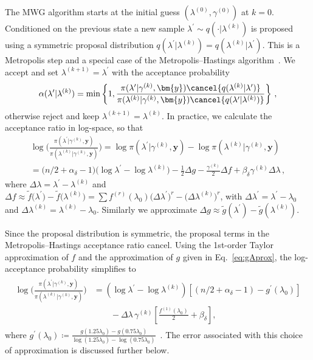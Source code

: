 The MWG algorithm starts at the initial guess $( \lambda^{(0)} , \gamma^{(0)}  )$ at $k=0$.
Conditioned on the previous state a new sample $\lambda^{\prime} \sim q(\cdot |  \lambda^{(k)})$ is proposed using a symmetric proposal distribution $q(\lambda^{\prime} |  \lambda^{(k)}) = q(\lambda^{(k)} |  \lambda^{\prime})$.
This is a Metropolis step and a special case of the Metropolis--Hastings algorithm~\cite{roberts2006harris}.
We accept and set $\lambda^{(k+1)} = \lambda^{\prime}$ with the acceptance probability
\begin{align}
\alpha( \lambda^{\prime} | \lambda^{(k)}) = \min \left\{ 1, \frac{\pi(\lambda^{\prime}  | \gamma^{(k)}, \bm{y}) \cancel{q(\lambda^{(k)} | \lambda^{\prime} ) } }{\pi(\lambda^{(k)} | \gamma^{(k)}, \bm{y}) \cancel{q(\lambda^{\prime} | \lambda^{(k)})} } \right\} \, ,
\end{align}
otherwise reject and keep $\lambda^{(k+1)} = \lambda^{(k)}$.
In practice, we calculate the acceptance ratio in log-space, so that
\begin{align} 
	\log\Bigg(  \frac{\pi(\lambda^{\prime} | \gamma^{(k)}, \bm{y})  }{\pi(\lambda^{(k)}| \gamma^{(k)}, \bm{y})}  \Bigg)
	= \log  \pi(\lambda^{\prime} | \gamma^{(k)}, \bm{y} )   -\log   \pi(\lambda^{(k)}| \gamma^{(k)}, \bm{y}) \\
	= \big( n/2+\alpha_{\delta}-1 \big) \Big(\log\lambda^{\prime} - \log\lambda^{(k)} \Big) - \frac{1}{2} \Delta g - \frac{\gamma^{(k)}}{2} \Delta f  + \beta_\delta \gamma^{(k)} \Delta \lambda  \, ,
\end{align}
where $\Delta \lambda = \lambda^{\prime} - \lambda^{(k)} $ and  $\Delta f \approx  \tilde{f} \big(\lambda^\prime\big) - \tilde{f}\big(\lambda^{(k)}\big) =   \sum f^{(r)}(\lambda_0) \big(\Delta \lambda^\prime \big)^r- \big(\Delta \lambda^{(k)} \big)^r $, with  $\Delta \lambda^{\prime} = \lambda^\prime - \lambda_0 $ and $\Delta \lambda^{(k)} =  \lambda^{(k)} - \lambda_0$.
Similarly we approximate $\Delta g \approx \tilde{g}(\lambda^{\prime}) -\tilde{g}(\lambda^{(k)})$.
\begin{mccorrection}
\noindent Since the proposal distribution is symmetric, the proposal terms in the Metropolis--Hastings acceptance ratio cancel. Using the 1st-order Taylor approximation of $f$ and the approximation of $g$ given in Eq.~\ref{eq:gAprox}, the log-acceptance probability simplifies to
\begin{align}
	\begin{split}
	\log\Bigg(  \frac{\pi(\lambda^{\prime} | \gamma^{(k)}, \bm{y})  }{\pi(\lambda^{(k)}| \gamma^{(k)}, \bm{y})}  \Bigg)& =\left(\log\lambda^{\prime} - \log\lambda^{(k)} \right)
	\left[ \left( n/2+\alpha_{\delta}-1 \right)- g^{\prime}(\lambda_0) \right] \\
	&\qquad - \Delta \lambda \, \gamma^{(k)}
	\left[\frac{f^{(1)}(\lambda_0)}{2}  + \beta_\delta \right],
	\end{split}
\end{align}
where $
	g^{\prime}(\lambda_0)
	\coloneqq 
	\frac{ g(1.25\lambda_{0}) - g(0.75\lambda_{0}) }
	{\log(1.25\lambda_{0}) - \log(0.75\lambda_{0}) } 
$~.
The error associated with this choice of approximation is discussed further  below.
\end{mccorrection} 


